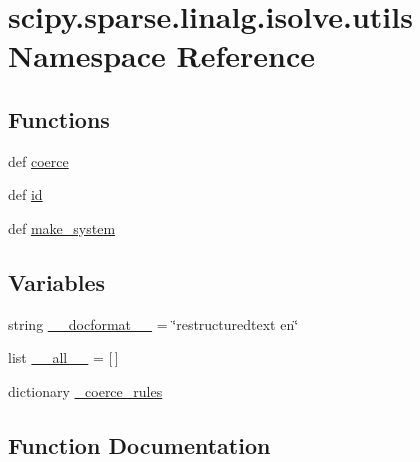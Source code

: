 \hypertarget{namespacescipy_1_1sparse_1_1linalg_1_1isolve_1_1utils}{}\section{scipy.\+sparse.\+linalg.\+isolve.\+utils Namespace Reference}
\label{namespacescipy_1_1sparse_1_1linalg_1_1isolve_1_1utils}
\subsection*{Functions}
\begin{DoxyCompactItemize}
\item 
def \hyperlink{namespacescipy_1_1sparse_1_1linalg_1_1isolve_1_1utils_a54757949523b337fcd6a6f884b6606f6}{coerce}
\item 
def \hyperlink{namespacescipy_1_1sparse_1_1linalg_1_1isolve_1_1utils_af5631c8c6e1205d4ac7efe128867d6b3}{id}
\item 
def \hyperlink{namespacescipy_1_1sparse_1_1linalg_1_1isolve_1_1utils_a1ac40c9540e974d3dbc3e32affb248ec}{make\+\_\+system}
\end{DoxyCompactItemize}
\subsection*{Variables}
\begin{DoxyCompactItemize}
\item 
string \hyperlink{namespacescipy_1_1sparse_1_1linalg_1_1isolve_1_1utils_a04412a92342b43fefb2c78efe66c37ec}{\+\_\+\+\_\+docformat\+\_\+\+\_\+} = \char`\"{}restructuredtext en\char`\"{}
\item 
list \hyperlink{namespacescipy_1_1sparse_1_1linalg_1_1isolve_1_1utils_a3d4975cee26d5d65ddef9dc4e15191a4}{\+\_\+\+\_\+all\+\_\+\+\_\+} = \mbox{[}$\,$\mbox{]}
\item 
dictionary \hyperlink{namespacescipy_1_1sparse_1_1linalg_1_1isolve_1_1utils_aaf644d3a49be0e1569a8dd3638df915f}{\+\_\+coerce\+\_\+rules}
\end{DoxyCompactItemize}


\subsection{Function Documentation}
\hypertarget{namespacescipy_1_1sparse_1_1linalg_1_1isolve_1_1utils_a54757949523b337fcd6a6f884b6606f6}{}

